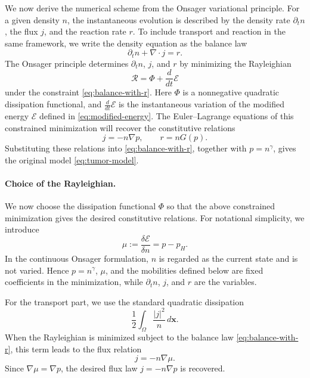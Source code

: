 \documentclass[11pt]{article}
\theoremstyle{plain}
\numberwithin{equation}{section}
\begin{document}
We now derive the numerical scheme from the Onsager variational principle.
For a given density \(n\), the instantaneous evolution is described
by the density rate \(\partial_t n\), the flux \(j\), and the reaction rate
\(r\). To include transport and reaction in the same framework, we write the
density equation as the balance law
\begin{equation}\label{eq:balance-with-r}
    \partial_t n+\nabla\cdot j=r .
\end{equation}
The Onsager principle determines \(\partial_t n\), \(j\), and \(r\) by
minimizing the Rayleighian
\[
    \mathcal R=\Phi+\frac{d}{dt}\mathcal E
\]
under the constraint \eqref{eq:balance-with-r}. Here \(\Phi\) is a
nonnegative quadratic dissipation functional, and
\(\frac{d}{dt}\mathcal E\) is the instantaneous variation of the modified
energy \(\mathcal E\) defined in \eqref{eq:modified-energy}. The
Euler--Lagrange equations of this constrained minimization will recover the
constitutive relations
\[
    j=-n\nabla p,
    \qquad
    r=nG(p).
\]
Substituting these relations into \eqref{eq:balance-with-r}, together with
\(p=n^\gamma\), gives the original model \eqref{eq:tumor-model}.


\paragraph{Choice of the Rayleighian.}
We now choose the dissipation functional \(\Phi\) so that the above
constrained minimization gives the desired constitutive relations. For
notational simplicity, we introduce
\begin{equation}\label{eq:modified-chemical-potential}
    \mu
    :=
    \frac{\delta\mathcal E}{\delta n}
    =
    p-p_H .
\end{equation}
In the continuous Onsager formulation, \(n\) is regarded as the current
state and is not varied. Hence \(p=n^\gamma\), \(\mu\), and the mobilities
defined below are fixed coefficients in the minimization, while
\(\partial_t n\), \(j\), and \(r\) are the variables.

For the transport part, we use the standard quadratic dissipation
\[
    \frac12\int_\Omega \frac{|j|^2}{n}\,d\mathbf{x} .
\]
When the Rayleighian is minimized subject to the balance law
\eqref{eq:balance-with-r}, this term leads to the flux relation
\[
    j=-n\nabla\mu .
\]
Since \(\nabla\mu=\nabla p\), the desired flux law
\(j=-n\nabla p\) is recovered.
\end{document}
